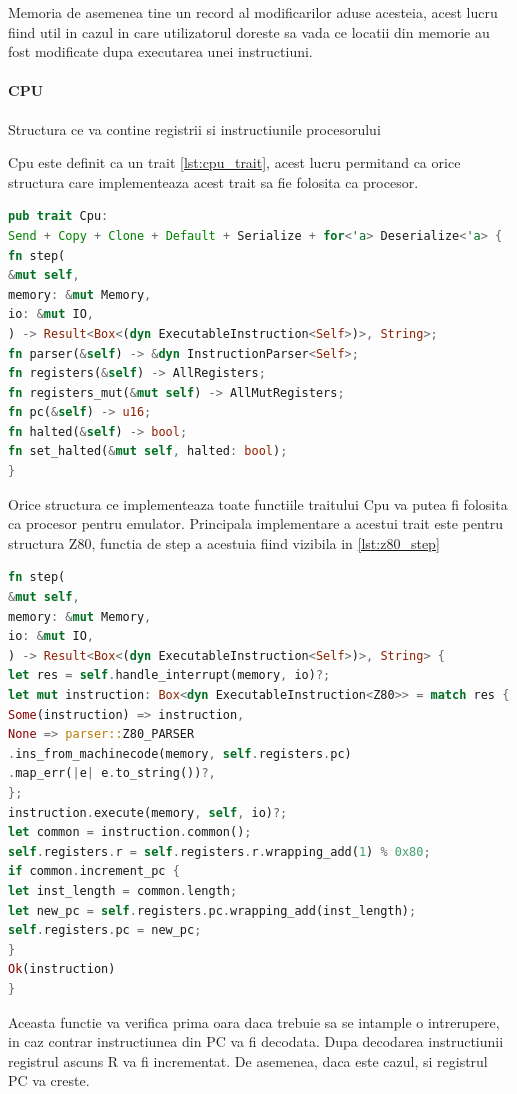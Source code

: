 \documentclass[titlepage,12pt]{article}
\begin{document}
Memoria de asemenea tine un record al modificarilor aduse acesteia, acest lucru fiind util in cazul in care utilizatorul doreste sa vada ce locatii din memorie au fost modificate dupa executarea unei instructiuni.

\paragraph{CPU} Structura ce va contine registrii si instructiunile procesorului

Cpu este definit ca un trait \cref{lst:cpu_trait}, acest lucru permitand ca orice structura care implementeaza acest trait sa fie folosita ca procesor.
\begin{lstlisting}[language=Rust,caption={Trait CPU},label={lst:cpu_trait}]
pub trait Cpu:
Send + Copy + Clone + Default + Serialize + for<'a> Deserialize<'a> {
fn step(
&mut self,
memory: &mut Memory,
io: &mut IO,
) -> Result<Box<(dyn ExecutableInstruction<Self>)>, String>;
fn parser(&self) -> &dyn InstructionParser<Self>;
fn registers(&self) -> AllRegisters;
fn registers_mut(&mut self) -> AllMutRegisters;
fn pc(&self) -> u16;
fn halted(&self) -> bool;
fn set_halted(&mut self, halted: bool);
}
\end{lstlisting}
Orice structura ce implementeaza toate functiile traitului Cpu va putea fi folosita ca procesor pentru emulator. Principala implementare a acestui trait este pentru structura Z80, functia de step a acestuia fiind vizibila in \cref{lst:z80_step}
\begin{lstlisting}[language=Rust,caption={Functia step Z80},label={lst:z80_step}]
fn step(
&mut self,
memory: &mut Memory,
io: &mut IO,
) -> Result<Box<(dyn ExecutableInstruction<Self>)>, String> {
let res = self.handle_interrupt(memory, io)?;
let mut instruction: Box<dyn ExecutableInstruction<Z80>> = match res {
Some(instruction) => instruction,
None => parser::Z80_PARSER
.ins_from_machinecode(memory, self.registers.pc)
.map_err(|e| e.to_string())?,
};
instruction.execute(memory, self, io)?;
let common = instruction.common();
self.registers.r = self.registers.r.wrapping_add(1) % 0x80;
if common.increment_pc {
let inst_length = common.length;
let new_pc = self.registers.pc.wrapping_add(inst_length);
self.registers.pc = new_pc;
}
Ok(instruction)
}
\end{lstlisting}

Aceasta functie va verifica prima oara daca trebuie sa se intample o intrerupere, in caz contrar instructiunea din PC va fi decodata. Dupa decodarea instructiunii registrul ascuns R va fi incrementat. De asemenea, daca este cazul, si registrul PC va creste.
\end{document}
